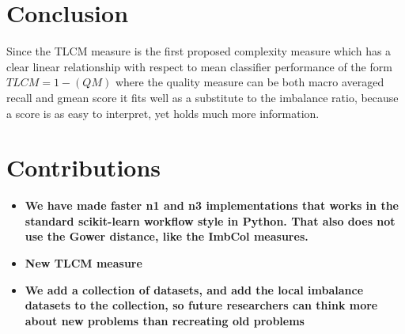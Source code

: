 \documentclass[twoside,leqno,twocolumn]{article}
\begin{document}
\section{Conclusion}
\label{sec:conclusion}
Since the TLCM measure is the first proposed complexity measure which has a clear linear relationship with respect to mean classifier performance of the form $TLCM=1-(QM)$ where the quality measure can be both macro averaged recall and gmean score it fits well as a substitute to the imbalance ratio, because a score is as easy to interpret, yet holds much more information. 

\section{Contributions}
\begin{itemize}
    \item \textbf{We have made faster n1 and n3 implementations that works in the standard scikit-learn workflow style in Python. That also does not use the Gower distance, like the ImbCol measures.}
    \item \textbf{New TLCM measure}
    \item \textbf{We add a collection of datasets, and add the local imbalance datasets to the collection, so future researchers can think more about new problems than recreating old problems}
\end{itemize}

\newpage


\end{document}
